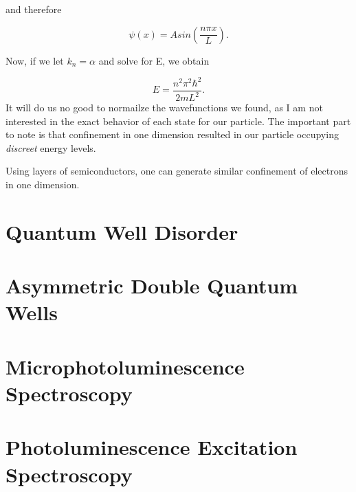 and therefore

\begin{equation}
\psi(x) = A sin(\frac{n \pi x}{L}).
\end{equation}

Now, if we let $k_n = \alpha$ and solve for E, we obtain

\begin{equation}
E = \frac{n^2 \pi^2 \hbar^2}{2 m L^2}.
\end{equation}
It will do us no good to normailze the wavefunctions we found, as I am not interested in the exact behavior of each state for our particle. The important part to note is that confinement in one dimension resulted in our particle occupying \textit{discreet} energy levels. 

\indent Using layers of semiconductors, one can generate similar confinement of electrons in one dimension.


\section{Quantum Well Disorder}

\section{Asymmetric Double Quantum Wells}




\section{Microphotoluminescence Spectroscopy}


\section{Photoluminescence Excitation Spectroscopy}